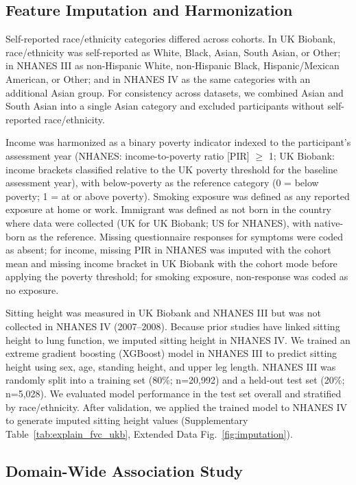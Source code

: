 \documentclass[10pt]{extarticle}
\begin{document}
\subsection{Feature Imputation and Harmonization}\label{feature-imputation-and-harmonization}

Self-reported race/ethnicity categories differed across cohorts. In UK Biobank, race/ethnicity was self-reported as White, Black, Asian, South Asian, or Other; in NHANES III as non-Hispanic White, non-Hispanic Black, Hispanic/Mexican American, or Other; and in NHANES IV as the same categories with an additional Asian group. For consistency across datasets, we combined Asian and South Asian into a single Asian category and excluded participants without self-reported race/ethnicity.

Income was harmonized as a binary poverty indicator indexed to the participant's assessment year (NHANES: income-to-poverty ratio [PIR] $\geq$ 1; UK Biobank: income brackets classified relative to the UK poverty threshold for the baseline assessment year), with below-poverty as the reference category (0 = below poverty; 1 = at or above poverty). Smoking exposure was defined as any reported exposure at home or work. Immigrant was defined as not born in the country where data were collected (UK for UK Biobank; US for NHANES), with native-born as the reference. Missing questionnaire responses for symptoms were coded as absent; for income, missing PIR in NHANES was imputed with the cohort mean and missing income bracket in UK Biobank with the cohort mode before applying the poverty threshold; for smoking exposure, non-response was coded as no exposure.

Sitting height was measured in UK Biobank and NHANES III but was not collected in NHANES IV (2007--2008). Because prior studies have linked sitting height to lung function, we imputed sitting height in NHANES IV. We trained an extreme gradient boosting (XGBoost) model in NHANES III to predict sitting height using sex, age, standing height, and upper leg length. NHANES III was randomly split into a training set (80\%; n=20,992) and a held-out test set (20\%; n=5,028). We evaluated model performance in the test set overall and stratified by race/ethnicity. After validation, we applied the trained model to NHANES IV to generate imputed sitting height values (Supplementary Table~\ref{tab:explain_fvc_ukb}, Extended Data Fig.~\ref{fig:imputation}).

\subsection{Domain-Wide Association Study}\label{domain-wide-association-study}
\end{document}
